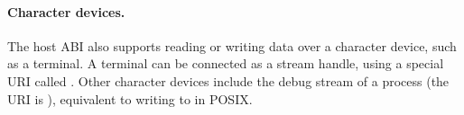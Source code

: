 \paragraph{Character devices.}
The host ABI also supports reading or writing data over a character device, such as a terminal.
A terminal can be connected as a stream handle,
using a special URI called .
Other character devices include the debug stream of a process (the URI is ),
equivalent to writing to  in POSIX.




